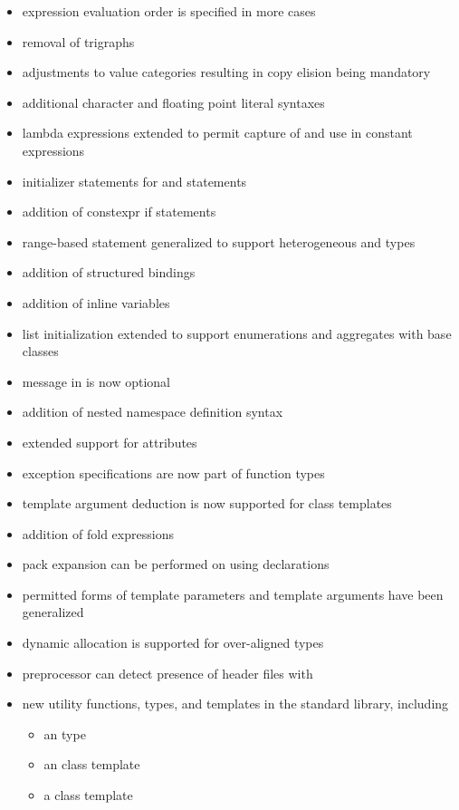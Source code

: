 \begin{itemize}
\item expression evaluation order is specified in more cases
\item removal of trigraphs
\item adjustments to value categories resulting in copy elision being mandatory
\item additional character and floating point literal syntaxes
\item lambda expressions extended to permit capture of  and use in constant expressions
\item initializer statements for  and  statements
\item addition of constexpr if statements
\item range-based  statement generalized to support heterogeneous  and  types
\item addition of structured bindings
\item addition of inline variables
\item list initialization extended to support enumerations and aggregates with base classes
\item message in  is now optional
\item addition of nested namespace definition syntax
\item extended support for attributes
\item exception specifications are now part of function types
\item template argument deduction is now supported for class templates
\item addition of fold expressions
\item pack expansion can be performed on using declarations
\item permitted forms of template parameters and template arguments have been generalized
\item dynamic allocation is supported for over-aligned types
\item preprocessor can detect presence of header files with 
\item new utility functions, types, and templates in the standard library, including
\begin{itemize}
  \item an  type
  \item an  class template
  \item a  class template

\end{itemize}
\end{itemize}

